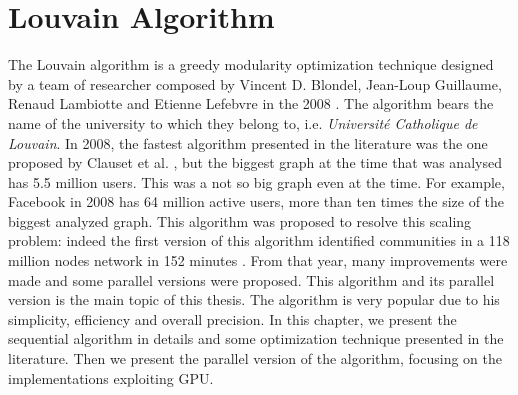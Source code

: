 
\section{Louvain Algorithm}
The Louvain algorithm is a greedy modularity optimization technique designed by a team of researcher composed by Vincent D. Blondel, Jean-Loup Guillaume, Renaud Lambiotte and Etienne Lefebvre in the 2008 \cite{Blondel_2008}. The algorithm bears the name of the university to which they belong to, i.e. \textit{Université Catholique de Louvain}.
In 2008, the fastest algorithm presented in the literature was the one proposed by Clauset et al. \cite{Clauset_2004}, but the biggest graph at the time that was analysed has 5.5 million users. This was a not so big graph even at the time. For example, Facebook in 2008 has 64 million active users, more than ten times the size of the biggest analyzed graph. This algorithm was proposed to resolve this scaling problem:  indeed the first version of this algorithm identified communities in a 118 million nodes network in 152 minutes \cite{Blondel_2008}. From that year, many improvements were made and some parallel versions were proposed. 
This algorithm and its parallel version is the main topic of this thesis. The algorithm is very popular due to his simplicity, efficiency and overall precision.
In this chapter, we present the sequential algorithm in details and some optimization technique presented in the literature.
Then we present the parallel version of the algorithm, focusing on the implementations exploiting GPU.
